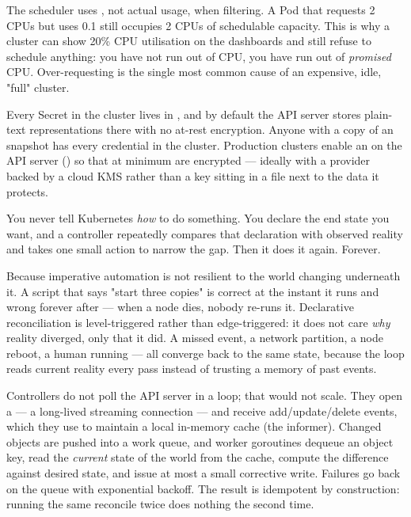 \begin{misconception}
The scheduler uses , not actual usage, when filtering. A Pod that requests 2 CPUs but uses 0.1 still occupies 2 CPUs of schedulable capacity. This is why a cluster can show 20\% CPU utilisation on the dashboards and still refuse to schedule anything: you have not run out of CPU, you have run out of \emph{promised} CPU. Over-requesting is the single most common cause of an expensive, idle, "full" cluster.
\end{misconception}

\begin{secwarn}
Every Secret in the cluster lives in , and by default the API server stores plain-text representations there with no at-rest encryption. Anyone with a copy of an  snapshot has every credential in the cluster. Production clusters enable an  on the API server () so that at minimum  are encrypted --- ideally with a  provider backed by a cloud KMS rather than a key sitting in a file next to the data it protects.
\end{secwarn}


 You never tell Kubernetes \emph{how} to do something. You declare the end state you want, and a controller repeatedly compares that declaration with observed reality and takes one small action to narrow the gap. Then it does it again. Forever.

 Because imperative automation is not resilient to the world changing underneath it. A script that says "start three copies" is correct at the instant it runs and wrong forever after --- when a node dies, nobody re-runs it. Declarative reconciliation is level-triggered rather than edge-triggered: it does not care \emph{why} reality diverged, only that it did. A missed event, a network partition, a node reboot, a human running  --- all converge back to the same state, because the loop reads current reality every pass instead of trusting a memory of past events.

 Controllers do not poll the API server in a loop; that would not scale. They open a  --- a long-lived streaming connection --- and receive add/update/delete events, which they use to maintain a local in-memory cache (the informer). Changed objects are pushed into a work queue, and worker goroutines dequeue an object key, read the \emph{current} state of the world from the cache, compute the difference against desired state, and issue at most a small corrective write. Failures go back on the queue with exponential backoff. The result is idempotent by construction: running the same reconcile twice does nothing the second time.

